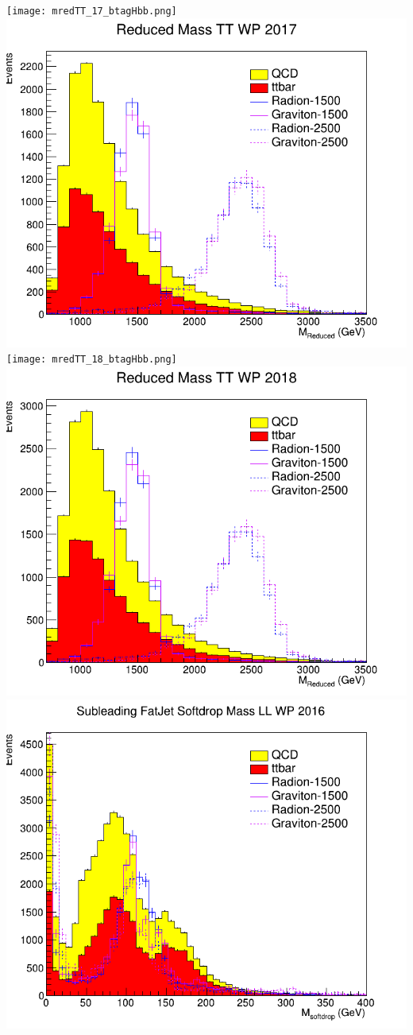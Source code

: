 \texttt{[image: mredTT\_17\_btagHbb.png]}
\includegraphics[width=1\textwidth]{mredTT_17_deepTagMD_HbbvsQCD.png}
\texttt{[image: mredTT\_18\_btagHbb.png]}
\includegraphics[width=1\textwidth]{mredTT_18_deepTagMD_HbbvsQCD.png}
\includegraphics[width=1\textwidth]{msd1LL_16_btagHbb.png}
